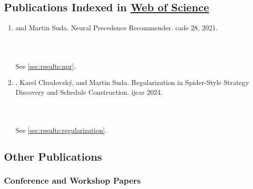 \subsection{Publications Indexed in \href{https://www.webofscience.com/}{Web of Science}}
\label{sec:wos}

\begin{enumerate}

\item {} and Martin Suda.
Neural Precedence Recommender.
\Gls{cade} 28, 2021.
\cite{DBLP:conf/cade/Bartek021}
\\ 
\\ 
\\ 
\\ See \cref{sec:results:npr}.

\item {}, Karel Chvalovský, and Martin Suda. Regularization in Spider-Style Strategy Discovery and Schedule Construction. \Gls{ijcar} 2024. \cite{DBLP:conf/ijcar/BartekCS24}
\\ 
\\ 
\\ 
\\ See \cref{sec:results:regularization}.

\end{enumerate}

\subsection{Other Publications}

\subsubsection{Conference and Workshop Papers}


